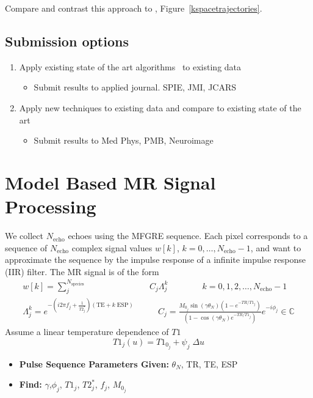 \documentclass[10pt]{amsart}
\begin{document}
Compare and contrast this approach to \cite{Odeen2014,Wright2014},
Figure~\ref{kspacetrajectories}.


\subsection{Submission options}
\begin{enumerate}
 \item Apply existing state of the art algorithms~\cite{Hansen2013} to existing data
  \begin{itemize}
    \item Submit results to applied journal. SPIE, JMI, JCARS
  \end{itemize}
 \item Apply new techniques to existing data and compare to existing state of the art
  \begin{itemize}
    \item Submit results to  Med Phys, PMB, Neuroimage
  \end{itemize}
\end{enumerate}


\section{Model Based MR Signal Processing}\label{ModelBasedProcessing}
We collect $N_\text{echo}$ echoes using the MFGRE sequence. Each pixel
corresponds to a sequence of $N_\text{echo}$ complex signal values $w[k]$, $k=0,\dots,N_\text{echo}-1$,
and want to approximate the sequence by the impulse response of a infinite
impulse response (IIR) filter.  The MR signal is of the form 
\begin{equation}
\label{FullSignalModel}
\begin{split}
 w[k]  = \sum_j^{N_\text{species}} 
& C_j \Lambda_j^k 
  \qquad  \qquad k = 0,1,2,\dots,N_\text{echo}-1
\\
\Lambda_j^k  = e^{-\left( i 2\pi f_j + \frac{1}{T2^*_j} \right) 
 \left( \text{TE} + k \; \text{ESP} \right) } 
\quad & \quad
C_j = \frac{M_{0_j} \sin \left(\gamma \theta_N \right)\left( 1- e^{-TR/T1_j}\right)}{\left( 1- \cos \left(\gamma \theta_N \right) e^{-TR/T1_j}\right)}
e^{-i  \phi_j} 
\in  \mathbb{C} 
\end{split}
\end{equation}
Assume a linear temperature dependence of $T1$
\[
  T1_j(u) = T1_{0_j} + \psi_j \; \Delta u
\]
\begin{itemize}
\item \textbf{Pulse Sequence Parameters Given:} $\theta_N$, TR, TE, ESP
\item \textbf{Find:} $\gamma$,$\phi_j$, $T1_j$, $T2^*_j$, $f_j$, $M_{0_j}$
\end{itemize}
\end{document}

